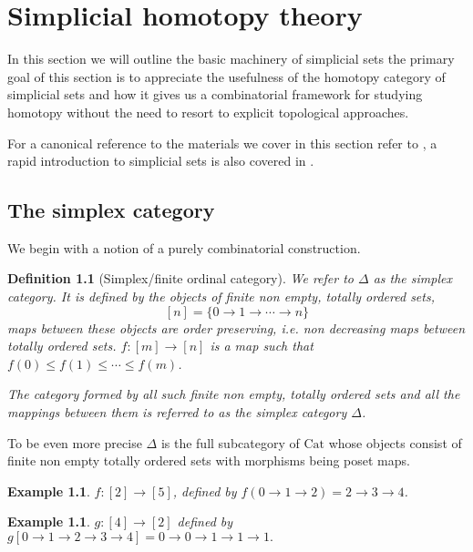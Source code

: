 \documentclass[12pt]{report}
\numberwithin{equation}{section}
\newtheorem{definition}[dummy]{Definition}
\newtheorem{example}[dummy]{Example}
\begin{document}
	
	\chapter{Simplicial homotopy theory}
		
		In this section we will outline the basic machinery of simplicial sets the primary goal of this section is to appreciate the usefulness of the homotopy category of simplicial sets and how it gives us a combinatorial framework for studying homotopy without the need to resort to explicit topological approaches. 
		
		
		For a canonical reference to the materials we cover in this section refer to \cite{Goerss_Jardine_2009}, a rapid introduction to simplicial sets is also covered in \cite{Riehl2011ALI}.
	\section{The simplex category}
	We begin with a notion of a purely combinatorial construction.
	
	\begin{definition}[Simplex/finite ordinal category]
		We refer to $\Delta$ as the simplex category. It is defined by the objects of finite non empty, totally ordered sets,
		\[ [n]=\{0 \to 1 \to \cdots \to n\} \]
		maps between these objects are order preserving, i.e. non decreasing maps between totally ordered sets.
		$f: [m] \to [n]$ is a map such that $f(0) \leq f(1) \leq \cdots \leq f(m)$.
		
		The category formed by all such finite non empty, totally ordered sets and all the mappings between them is referred to as the simplex category $\Delta$.
	\end{definition}
	To be even more precise $\Delta$ is	the full subcategory of $\mathrm{Cat}$ whose objects consist of finite non empty totally ordered sets with morphisms being poset maps.
	
	
	\begin{example}
		$f:[2] \to [5]$, defined by $f(0 \to 1 \to 2) = 2 \to 3 \to 4$.
		
	
	\end{example}	
	\begin{example}
		
		$g:[4] \to [2]$ defined by $g[0 \to 1 \to 2\to 3 \to 4] = 0\to 0 \to 1 \to 1 \to 1.$		
	\end{example}
	
\end{document}
